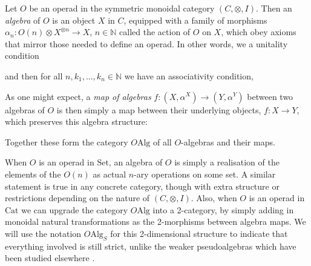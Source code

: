 \begin{defn} \label{opalg} Let $O$ be an operad in the symmetric monoidal category $(C, \otimes, I)$. Then an \emph{algebra} of $O$ is an object $X$ in $C$, equipped with a family of morphisms $\alpha_n : O(n) \otimes X^{\otimes n} \to X$, $n \in \mathbb{N}$ called the action of $O$ on $X$, which obey axioms that mirror those needed to define an operad. In other words, we a unitality condition
\begin{eq*}  \end{eq*}
and then for all $n, k_1, ...,  k_n \in \mathbb{N}$ we have an associativity condition,
\begin{eq*}  \end{eq*}
As one might expect, a \emph{map of algebras} $f: (X, \alpha^X) \to (Y, \alpha^Y)$ between two algebras of $O$ is then simply a map between their underlying objects, $f: X \to Y$, which preserves this algebra structure:
\begin{eq*}  \end{eq*}
Together these form the category $O\mathrm{Alg}$ of all $O$-algebras and their maps.
\end{defn}

When $O$ is an operad in $\mathrm{Set}$, an algebra of $O$ is simply a realisation of the elements of the $O(n)$ as actual $n$-ary operations on some set. A similar statement is true in any concrete category, though with extra structure or restrictions depending on the nature of $(C, \otimes, I)$. Also, when $O$ is an operad in $\mathrm{Cat}$ we can upgrade the category $O\mathrm{Alg}$ into a 2-category, by simply adding in monoidal natural transformations as the 2-morphisms between algebra maps. We will use the notation $O\mathrm{Alg}_{S}$ for this 2-dimensional structure to indicate that everything involved is still strict, unlike the weaker pseudoalgebras which have been studied elsewhere \cite{ogge}.


